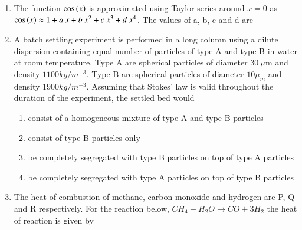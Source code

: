 \documentclass[journal,12pt,onecolumn]{IEEEtran}
\theoremstyle{remark}
\begin{document}
\begin{enumerate}
		\item The function $\cos\left(x\right)$ is approximated using Taylor series around $x=0$ as $\cos\left(x\right)\approx1+a~x+b~x^{2}+c~x^{3}+d~x^{4}$. The values of a, b, c and d are
		
		\hfill{}
		
		\begin{enumerate}
		\end{enumerate}
		
		\item A batch settling experiment is performed in a long column using a dilute dispersion containing equal number of particles of type A and type B in water  at room temperature. Type A are spherical particles of diameter $30~\mu\text{m}$ and density $1100kg/m^{-3}$. Type B are spherical particles of diameter $10\mu_{m}$ and density $1900kg/m^{-3}$. Assuming that Stokes' law is valid throughout the duration of the experiment, the settled bed would
		
		\hfill{\brak{\text{GATE CH 2021}}}
		
		\begin{enumerate}
		\item consist of a homogeneous mixture of type A and type B particles
		\item consist of type B particles only
		\item be completely segregated with type B particles on top of type A particles
		\item be completely segregated with type A particles on top of type B particles
		\end{enumerate}
		
		\item The heat of combustion of methane, carbon monoxide and hydrogen are P, Q and R respectively. For the reaction below, $CH_{4}+H_{2}O\longrightarrow CO+3H_{2}$ the heat of reaction is given by
		
		\hfill{}
		
		\begin{enumerate}
		\end{enumerate}
		

\end{enumerate}
\end{document}
